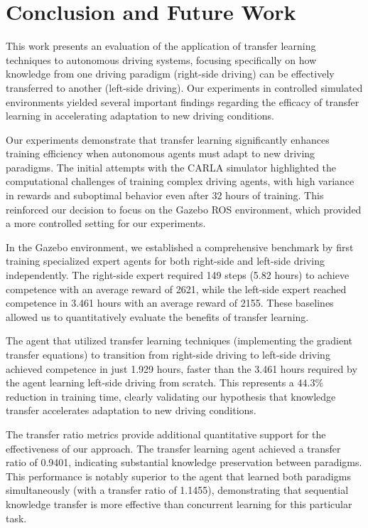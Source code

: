 \chapter{Conclusion and Future Work}
This work presents an evaluation of the application of transfer learning techniques to autonomous driving systems, focusing specifically on how knowledge from one driving paradigm (right-side driving) can be effectively transferred to another (left-side driving). Our experiments in controlled simulated environments yielded several important findings regarding the efficacy of transfer learning in accelerating adaptation to new driving conditions.

Our experiments demonstrate that transfer learning significantly enhances training efficiency when autonomous agents must adapt to new driving paradigms. The initial attempts with the CARLA simulator highlighted the computational challenges of training complex driving agents, with high variance in rewards and suboptimal behavior even after 32 hours of training. This reinforced our decision to focus on the Gazebo ROS environment, which provided a more controlled setting for our experiments.

In the Gazebo environment, we established a comprehensive benchmark by first training specialized expert agents for both right-side and left-side driving independently. The right-side expert required 149 steps (5.82 hours) to achieve competence with an average reward of 2621, while the left-side expert reached competence in 3.461 hours with an average reward of 2155. These baselines allowed us to quantitatively evaluate the benefits of transfer learning.

The agent that utilized transfer learning techniques (implementing the gradient transfer equations) to transition from right-side driving to left-side driving achieved competence in just 1.929 hours, faster than the 3.461 hours required by the agent learning left-side driving from scratch. This represents a $44.3\%$ reduction in training time, clearly validating our hypothesis that knowledge transfer accelerates adaptation to new driving conditions.

The transfer ratio metrics provide additional quantitative support for the effectiveness of our approach. The transfer learning agent achieved a transfer ratio of 0.9401, indicating substantial knowledge preservation between paradigms. This performance is notably superior to the agent that learned both paradigms simultaneously (with a transfer ratio of 1.1455), demonstrating that sequential knowledge transfer is more effective than concurrent learning for this particular task.

